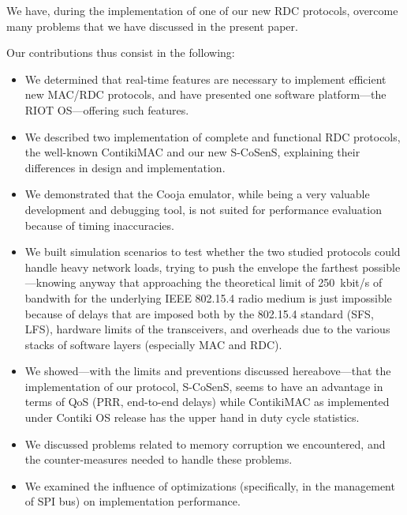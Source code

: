 \documentclass[conference]{IEEEtran}
\begin{document}
We have, during the implementation of one of our new RDC protocols, overcome
many problems that we have discussed in the present paper.

Our contributions thus consist in the following:

\begin{itemize}

\item We determined that real-time features are necessary to implement
      efficient new MAC/RDC protocols, and have presented one software
      platform---the RIOT OS---offering such features.

\item We described two implementation of complete and functional RDC
      protocols, the well-known ContikiMAC and our new S-CoSenS, explaining
      their differences in design and implementation.

\item We demonstrated that the Cooja emulator, while being a very valuable
      development and debugging tool, is not suited for performance
      evaluation because of timing inaccuracies.

\item We built simulation scenarios to test whether the two studied protocols
      could handle heavy network loads, trying to push the envelope
      the farthest possible---knowing anyway that approaching the theoretical
      limit of 250~kbit/s of bandwith for the underlying IEEE 802.15.4 radio
      medium is just impossible because of delays that are imposed both by
      the 802.15.4 standard (SFS, LFS), hardware limits of the transceivers,
      and overheads due to the various stacks of software layers (especially
      MAC and RDC).

\item We showed---with the limits and preventions discussed hereabove---that
      the implementation of our protocol, S-CoSenS, seems to have an
      advantage in terms of QoS (PRR, end-to-end delays) while ContikiMAC
      as implemented under Contiki OS release has the upper hand in
      duty cycle statistics.

\item We discussed problems related to memory corruption we encountered,
      and the counter-measures needed to handle these problems.

\item We examined the influence of optimizations (specifically, in the
      management of SPI bus) on implementation performance.

\end{itemize}
\end{document}
